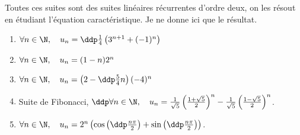 
\begin{correction} \;
Toutes ces suites sont des suites lin\'eaires r\'ecurrentes d'ordre deux, on les r\'esout en \'etudiant l'\'equation caract\'eristique. Je ne donne ici que le r\'esultat.
\begin{enumerate}
 \item $\forall n\in\N,\quad u_n=\ddp\frac{1}{4}\left( 3^{n+1}+(-1)^n \right)$
\item $\forall n\in\N,\quad u_n=(1-n) 2^n  $
\item $\forall n\in\N,\quad u_n=\left(2-\ddp\frac{5}{4}n\right)(-4)^{n}  $
\item Suite de Fibonacci, $\ddp \forall n\in\N,\quad u_n=\frac{1}{\sqrt{5}}\left(\frac{1+\sqrt{5}}{2}\right)^n-\frac{1}{\sqrt{5}}\left(\frac{1-\sqrt{5}}{2}\right)^n$.
\item $\forall n\in\N,\quad u_n=2^n\left( \cos{\left( \ddp\frac{n\pi}{2} \right)}+\sin{\left( \ddp\frac{n\pi}{2} \right)}  \right) $.
\end{enumerate}
\end{correction}